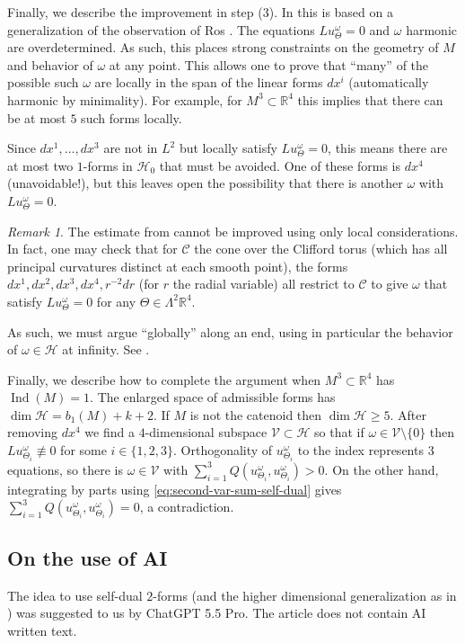 \documentclass[11pt]{amsart}
\numberwithin{equation}{section}
\theoremstyle{plain}
\theoremstyle{definition}
\theoremstyle{remark}
\newtheorem{remark}[remark]{Remark}
\newcommand{\R}{\mathbb{R}}
\DeclareMathOperator{\Ind}{Ind}
\newcommand{\Hcal}{\mathcal H}
\newcommand{\Hzero}{\mathcal H_0}
\newcommand{\Vcal}{\mathcal V}
\begin{document}
Finally, we describe the improvement in step (3). In \cite{Li2017} this is based on a generalization of the observation of Ros \cite{Ros2006}. The equations $Lu^\omega_\Theta = 0$ and $\omega$ harmonic are overdetermined. As such, this places strong constraints on the geometry of $M$ and behavior of $\omega$ at any point. This allows one to prove that ``many'' of the possible such $\omega$ are locally in the span of the linear forms $dx^i$ (automatically harmonic by minimality). For example, for $M^3\subset\R^4$ this implies that there can be at most $5$ such forms locally. 

Since $dx^1,\dots,dx^3$ are not in $L^2$ but locally satisfy $Lu^\omega_\Theta = 0$, this means there are at most two $1$-forms in $\Hzero$ that must be avoided. One of these forms is $dx^4$ (unavoidable!), but this leaves open the possibility that there is another $\omega$ with $Lu^\omega_\Theta=0$.


\begin{remark}
The estimate from \cite[Proposition 5.1]{Li2017} cannot be improved using only local considerations. In fact, one may check that for $\mathcal{C}$ the cone over the Clifford torus (which has all principal curvatures distinct at each smooth point), the forms $dx^1,dx^2,dx^3,dx^4,r^{-2} dr$ (for $r$ the radial variable) all restrict to $\mathcal{C}$ to give $\omega$ that satisfy $Lu^\omega_\Theta = 0$ for any $\Theta \in \Lambda^2\R^4$. 
\end{remark}
As such, we must argue ``globally'' along an end, using in particular the behavior of $\omega \in \Hcal$ at infinity. See . 

Finally, we describe how to complete the argument when $M^3\subset \R^4$ has $\Ind(M) = 1$. The enlarged space of admissible forms has $\dim \Hcal = b_1({M}) + k + 2$. If $M$ is not the catenoid then $\dim \Hcal \geq 5$. After removing $dx^4$ we find a $4$-dimensional subspace $\Vcal \subset \Hcal$ so that if $\omega \in\Vcal\setminus\{0\}$ then $L u^\omega_{\Theta_i} \not \equiv 0$ for some $i\in\{1,2,3\}$. Orthogonality of $u^\omega_{\Theta_i}$ to the index represents $3$ equations, so there is $\omega \in \Vcal$ with $\sum_{i=1}^3 Q(u^\omega_{\Theta_i},u^\omega_{\Theta_i}) > 0$. On the other hand, integrating by parts using \eqref{eq:second-var-sum-self-dual} gives $\sum_{i=1}^3 Q(u^\omega_{\Theta_i},u^\omega_{\Theta_i}) = 0$, a contradiction. 


\subsection{On the use of AI}
The idea to use self-dual $2$-forms (and the higher dimensional generalization as in ) was suggested to us by ChatGPT 5.5 Pro. The article does not contain AI written text. 
\end{document}
